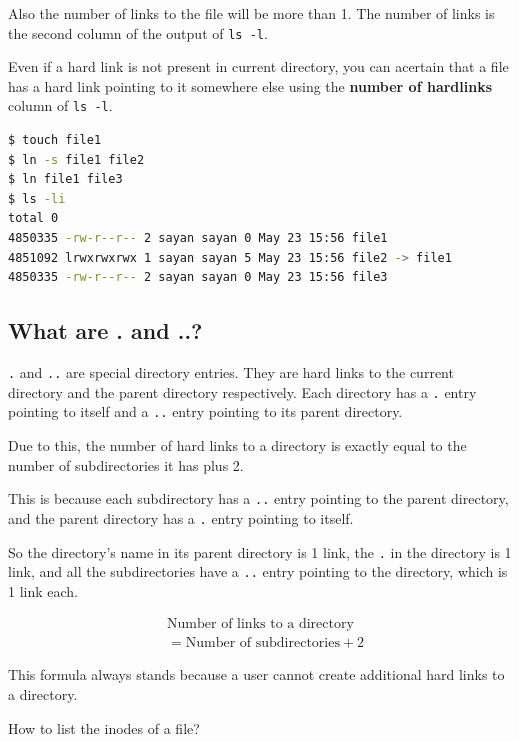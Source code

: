 Also the number of links to the file will be more than 1.
The number of links is the second
column of the output of \lstinline|ls -l|.

Even if a hard link is not present in current directory, you can acertain that a file has a hard link pointing to it somewhere else using the \textbf{number of hardlinks} column of \lstinline|ls -l|.

\begin{lstlisting}[language=bash]
$ touch file1
$ ln -s file1 file2
$ ln file1 file3
$ ls -li
total 0
4850335 -rw-r--r-- 2 sayan sayan 0 May 23 15:56 file1
4851092 lrwxrwxrwx 1 sayan sayan 5 May 23 15:56 file2 -> file1
4850335 -rw-r--r-- 2 sayan sayan 0 May 23 15:56 file3
\end{lstlisting}

\subsection{What are . and ..?}

\lstinline|.| and \lstinline|..| are special directory entries.
They are hard links to the current directory and the parent directory respectively.
Each directory has a \lstinline|.| entry pointing to itself and a \lstinline|..| entry pointing to its parent directory.

Due to this, the number of hard links to a directory is exactly equal to the number of subdirectories it has plus 2.

This is because each subdirectory has a \lstinline|..| entry pointing to the parent directory, and the parent directory has a \lstinline|.| entry pointing to itself.

So the directory's name in its parent directory is 1 link,
the \lstinline|.| in the directory is 1 link,
and all the subdirectories have a \lstinline|..| entry pointing to the directory, which is 1 link each.

\[
  \begin{aligned}
    &\text{Number of links to a directory} \\
    &= \text{Number of subdirectories} + 2
  \end{aligned}
\]

This formula always stands because a user cannot create additional hard links to a directory.





\begin{qs}
  How to list the inodes of a file?
\end{qs}

